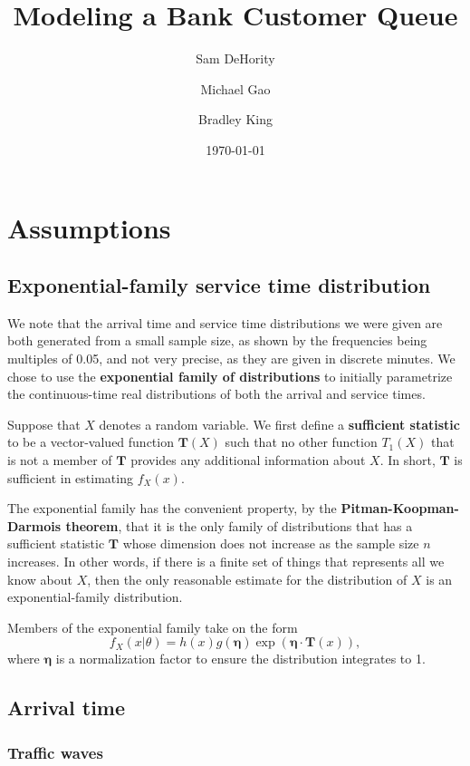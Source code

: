 \documentclass[11pt]{article}
\title{Modeling a Bank Customer Queue}
\date{\today}
\author{Sam DeHority \and Michael Gao \and Bradley King}
\begin{document}
\maketitle

\section{Assumptions}
\subsection{Exponential-family service time distribution}

We note that the arrival time and service time distributions we were given are both generated from a small sample size, as shown by the frequencies being multiples of 0.05, and not very precise, as they are given in discrete minutes.  We chose to use the \textbf{exponential family of distributions} \cite{exponential_family} to initially parametrize the continuous-time real distributions of both the arrival and service times.

Suppose that $X$ denotes a random variable.  We first define a \textbf{sufficient statistic} to be a vector-valued function $\bm{T}(X)$ such that no other function $T_1(X)$ that is not a member of $\bm{T}$ provides any additional information about $X$.  In short, $\bm{T}$ is sufficient in estimating $f_X (x)$.

The exponential family has the convenient property, by the \textbf{Pitman-Koopman-Darmois theorem}, that it is the only family of distributions that has a sufficient statistic $\bm{T}$ whose dimension does not increase as the sample size $n$ increases.  In other words, if there is a finite set of things that represents all we know about $X$, then the only reasonable estimate for the distribution of $X$ is an exponential-family distribution.

Members of the exponential family take on the form
$$f_X (x | \theta) = h(x)g(\bm{\eta})\exp\left( \bm{\eta}\cdot\mathbf{T}(x) \right),$$
where $\bm{\eta}$ is a normalization factor to ensure the distribution integrates to 1.

\subsection{Arrival time}
\subsubsection{Traffic waves}
\end{document}
